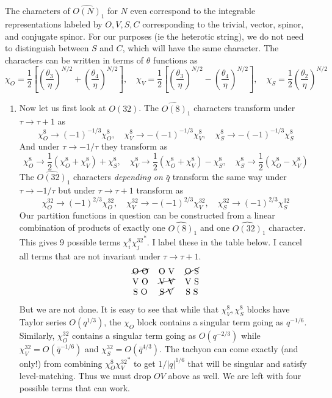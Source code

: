 \documentclass[11pt, class=article, crop=false]{standalone}
\begin{document}
\begin{enumerate}
	The characters of $\widehat{O(N)}_1$ for $N$ even correspond to the integrable representations labeled by $O, V, S, C$ corresponding to the trivial, vector, spinor, and conjugate spinor. For our purposes (ie the heterotic string), we do not need to distinguish between $S$ and $C$, which will have the same character. The characters can be written in terms of $\theta$ functions as
	\[
		\chi_O = \frac12 \left[\left(\frac{\theta_3}{\eta}\right)^{N/2} + \left(\frac{\theta_4}{\eta}\right)^{N/2} \right], \quad
		\chi_V = \frac12 \left[\left(\frac{\theta_3}{\eta}\right)^{N/2} - \left(\frac{\theta_4}{\eta}\right)^{N/2} \right], \quad
		\chi_S = \frac12 \left(\frac{\theta_2}{\eta}\right)^{N/2}
	\]
	\begin{enumerate}
		\item Now let us first look at $O(32)$. 
	The $\widehat{O(8)}_1$ characters transform under $\tau \to \tau+1$ as 
	\[
		\chi_O^8 \to (-1)^{-1/3} \chi_O^8, \quad \chi_V^8 \to - (-1)^{-1/3} \chi_V^8, \quad \chi_S^8 \to - (-1)^{-1/3} \chi_S^8
	\]
	And under $\tau \to -1/\tau$ they transform as
	\[
			\chi_O^8 \to \frac12 (\chi_O^8 + \chi_V^8) + \chi_S^8, 
			\quad \chi_V^8 \to \frac12 (\chi_O^8 + \chi_V^8) - \chi_S^8,
			\quad \chi_S^8 \to \frac12 (\chi_O^8 - \chi_V^8)
	\]
	The $\widehat{O(32)}_1$ characters \emph{depending on $\bar q$} transform the same way under $\tau \to -1/\tau$ but under $\tau \to \tau + 1$ transform as
	\[
		\chi_O^{32} \to (-1)^{2/3} \chi_O^{32}, \quad \chi_V^{32} \to - (-1)^{2/3} \chi_V^{32}, \quad \chi_S^{32} \to (-1)^{2/3} \chi_S^{32}
	\]
	Our partition functions in question can be constructed from a linear combination of products of exactly one $\widehat{O(8)}_1$ and one $\widehat{O(32)}_1$ character. This gives 9 possible terms $\chi_i^8 {\chi^{32}_j}^*$. I label these in the table below. I cancel all terms that are not invariant under $\tau \to \tau + 1$. 
	\[
		\begin{tabular}{c c c}
			\cancel{O O} & O V & \cancel{O S}\\
			V O & \cancel{V V} & V S\\
			S O & \cancel{S V} & S S
		\end{tabular}
	\]
	But we are not done. It is easy to see that while that $\chi_V^8, \chi_S^8$ blocks have Taylor series $O(q^{1/3})$, the $\chi_O$ block contains a singular term going as $q^{-1/6}$. Similarly, $\chi_O^{32}$ contains a singular term going as $O(q^{-2/3})$ while $\chi_V^{32} = O(\bar q^{-1/6})$ and $\chi_{S}^{32} = O(\bar q^{4/3})$. The tachyon can come exactly (and only!) from combining $\chi_O^{8} {\chi_V^{32}}^*$ to get $1/|q|^{1/6}$ that will be singular and satisfy level-matching. Thus we must drop $O V$ above as well. We are left with four possible terms that can work. 
	

\end{enumerate}
\end{enumerate}
\end{document}
